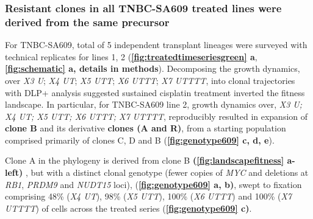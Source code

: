 \subsubsection{Resistant clones in all TNBC-SA609 treated lines were derived from the same precursor}
For TNBC-SA609, total of 5 independent transplant lineages  were surveyed with technical replicates for lines 1, 2 (\textbf{\autoref{fig:treatedtimeseriesgreen} a}, \textbf{\autoref{fig:schematic} a, details in methods}).
Decomposing the growth dynamics, over \textit{X3 U}; \textit{X4 UT}; \textit{X5 UTT}; \textit{X6 UTTT}; \textit{X7 UTTTT}, into clonal trajectories with DLP+ analysis suggested sustained cisplatin treatment inverted the fitness landscape. In particular, for TNBC-SA609 line 2, growth dynamics over, \textit{X3 U; X4 UT; X5 UTT; X6 UTTT; X7 UTTTT}, reproducibly resulted in expansion of \textbf{clone B} and its derivative \textbf{clones (A and R)}, from a starting population comprised primarily of clones C, D and B (\textbf{\autoref{fig:genotype609} c, d, e}).

Clone A in the phylogeny is derived from clone B \textbf{(\autoref{fig:landscapefitness} a-left)} , but with a distinct clonal genotype (fewer copies of \textit{MYC} and deletions at \textit{RB1}, \textit{PRDM9} and \textit{NUDT15} loci), (\textbf{\autoref{fig:genotype609} a, b)}, swept to fixation comprising 48\% (\textit{X4 UT}), 98\% (\textit{X5 UTT}), 100\% (\textit{X6 UTTT}) and 100\% (\textit{X7 UTTTT}) of cells across the treated series (\textbf{\autoref{fig:genotype609} c)}.





